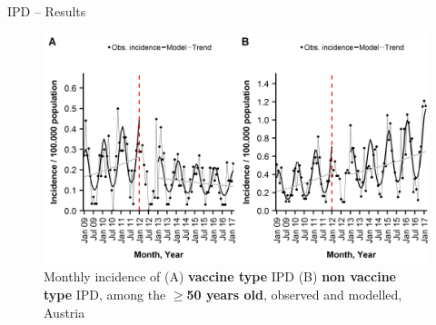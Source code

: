 \documentclass[table,notes]{beamer}\usepackage[]{graphicx}\usepackage[]{color}
\begin{document}
\begin{frame}[fragile]{IPD -- Results}
\begin{center}
\begin{figure}
  \centering
  \caption{Monthly incidence of (A) \textbf{vaccine type} IPD (B) \textbf{non vaccine type} IPD, among the \textbf{$\ge$50 years old}, observed and modelled, Austria}
  \includegraphics[width=\textwidth,height=0.5\textheight,keepaspectratio]{richter2019_Fig3.png}
\end{figure}
\end{center}
\vfill
{\scriptsize \cite{richter2019}}
\end{frame}
\end{document}

